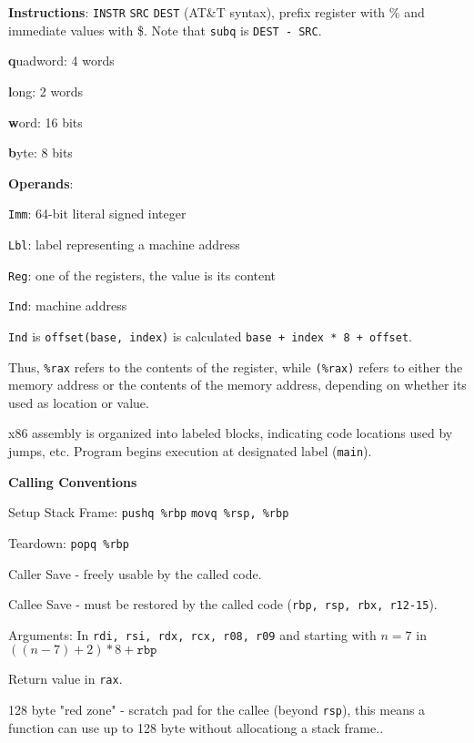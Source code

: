\textbf{Instructions}: \texttt{INSTR} \texttt{SRC} \texttt{DEST} (AT\&T syntax), prefix register with \% and immediate values with \$. Note that \texttt{subq} is \texttt{DEST - SRC}.\medskip

\begin{itemize*}
    \item \textbf{q}uadword: 4 words
    \item \textbf{l}ong: 2 words
    \item \textbf{w}ord: 16 bits
    \item \textbf{b}yte: 8 bits
\end{itemize*} \medskip

\textbf{Operands}:
\begin{compactitem}[$\quad\bullet$]
	\item \texttt{Imm}: 64-bit literal signed integer
	\item \texttt{Lbl}: label representing a machine address
	\item \texttt{Reg}: one of the registers, the value is its content
	\item \texttt{Ind}: machine address
\end{compactitem} \medskip

\texttt{Ind} is  \texttt{offset(base, index)} is calculated \texttt{base + index * 8 + offset}.\medskip

Thus, \texttt{\%rax} refers to the contents of the register, while \texttt{(\%rax)} refers to either the memory address or the contents of the memory address, depending on whether its used as location or value.\medskip

x86 assembly is organized into labeled blocks, indicating code locations used by jumps, etc. Program begins execution at designated label (\texttt{main}).\medskip

\textbf{Calling Conventions}
\begin{compactitem}[$\quad\bullet$]
	\item Setup Stack Frame: \texttt{pushq \%rbp} \quad \texttt{movq \%rsp, \%rbp}

	\item Teardown: \texttt{popq \%rbp}

	\item Caller Save - freely usable by the called code.

	\item Callee Save - must be restored by the called code (\texttt{rbp, rsp, rbx, r12-15}).

	\item Arguments: In \texttt{rdi, rsi, rdx, rcx, r08, r09} and starting with $n = 7$ in $((n-7) + 2) * 8 + \texttt{rbp}$

	\item Return value in \texttt{rax}.

	\item 128 byte "red zone" - scratch pad for the callee (beyond \texttt{rsp}), this means a function can use up to 128 byte without allocationg a stack frame..
\end{compactitem}
